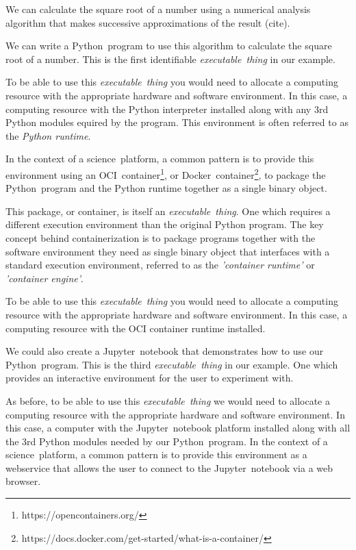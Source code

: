 \documentclass[11pt,a4paper]{ivoa}
\newcommand{\webservice} {webservice\xspace}
\newcommand{\webbrowser} {web browser\xspace}
\newcommand{\jupyternotebook} {Jupyter~notebook\xspace}
\newcommand{\python} {Python\xspace}
\newcommand{\pythonprogram} {Python~program\xspace}
\newcommand{\ocicontainer} {OCI~container}
\newcommand{\dockercontainer} {Docker~container}
\newcommand{\scienceplatform} {science~platform\xspace}
\newcommand{\executablething}  {\textit{executable~thing}\xspace}
\begin{document}
We can calculate the square root of a number using a numerical analysis
algorithm that makes successive approximations of the result (cite).

We can write a \pythonprogram to use this algorithm to calculate the square root of a number.
This is the first identifiable \executablething in our example.

To be able to use this \executablething you would need to allocate a computing resource with the appropriate
hardware and software environment. In this case, a computing resource with the \python interpreter installed
along with any 3rd \python modules equired by the program.
This environment is often referred to as the \textit{\python runtime}.

In the context of a \scienceplatform, a common pattern is to provide this environment using an
\ocicontainer\footnote{https://opencontainers.org/},
or
\dockercontainer\footnote{https://docs.docker.com/get-started/what-is-a-container/},
to package the \pythonprogram and the \python runtime together as a single binary object.

This package, or container, is itself an \executablething. One which requires a different execution
environment than the original \python program.
The key concept behind containerization is to package programs together with the software environment
they need as single binary object that interfaces with a standard execution environment,
referred to as the \textit{'container runtime'} or \textit{'container engine'}.

To be able to use this \executablething you would need to allocate a computing resource with the appropriate
hardware and software environment. In this case, a computing resource with the OCI container runtime installed.

We could also create a \jupyternotebook that demonstrates how to use our \pythonprogram.
This is the third \executablething in our example.
One which provides an interactive environment for the user to experiment with.

As before, to be able to use this \executablething we would need to allocate a computing resource with
the appropriate hardware and software environment.
In this case, a computer with the \jupyternotebook platform installed along with all the 3rd \python modules
needed by our \pythonprogram.
In the context of a \scienceplatform, a common pattern is to provide this environment as a \webservice
that allows the user to connect to the \jupyternotebook via a \webbrowser.
\end{document}
